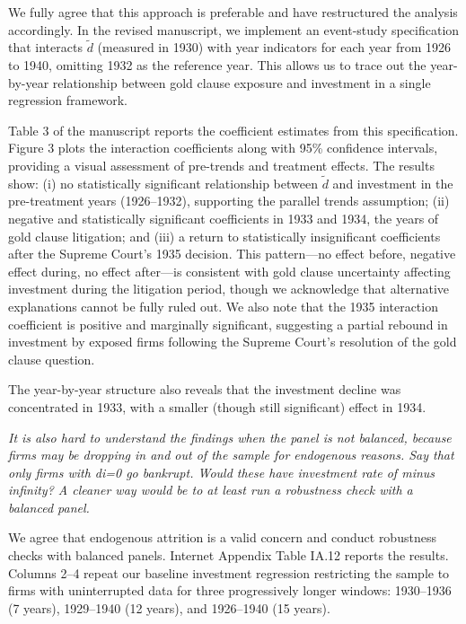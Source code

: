 \bigskip

\noindent We fully agree that this approach is preferable and have restructured the analysis accordingly. In the revised manuscript, we implement an event-study specification that interacts $\tilde{d}$ (measured in 1930) with year indicators for each year from 1926 to 1940, omitting 1932 as the reference year. This allows us to trace out the year-by-year relationship between gold clause exposure and investment in a single regression framework.

Table 3 of the manuscript reports the coefficient estimates from this specification. Figure 3 plots the  interaction coefficients along with 95\% confidence intervals, providing a visual assessment of pre-trends and treatment effects. The results show: (i) no statistically significant relationship between $\tilde{d}$ and investment in the pre-treatment years (1926--1932), supporting the parallel trends assumption; (ii) negative and statistically significant coefficients in 1933 and 1934, the years of gold clause litigation; and (iii) a return to statistically insignificant coefficients after the Supreme Court's 1935 decision. This pattern---no effect before, negative effect during, no effect after---is consistent with gold clause uncertainty affecting investment during the litigation period, though we acknowledge that alternative explanations cannot be fully ruled out. We also note that the 1935 interaction coefficient is positive and marginally significant, suggesting a partial rebound in investment by exposed firms following the Supreme Court's resolution of the gold clause question.

The year-by-year structure also reveals that the investment decline was concentrated in 1933, with a smaller (though still significant) effect in 1934.

\bigskip

\noindent \textit{\textcolor{red!60!black}{
It is also hard to understand the findings when the panel is not balanced, because firms may be dropping in and out of the sample for endogenous reasons. Say that only firms with di=0 go bankrupt. Would these have investment rate of minus infinity? A cleaner way would be to at least run a robustness check with a balanced panel.
}}

\bigskip

\noindent We agree that endogenous attrition is a valid concern and conduct robustness checks with balanced panels. Internet Appendix Table IA.12 reports the results. Columns 2--4 repeat our baseline investment regression restricting the sample to firms with uninterrupted data for three progressively longer windows: 1930--1936 (7 years), 1929--1940 (12 years), and 1926--1940 (15 years).

